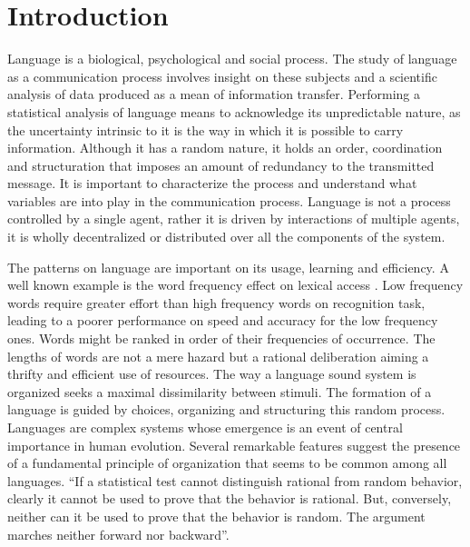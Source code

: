 \chapter{Introduction}
Language is a biological, psychological and social process. 
The study of language as a communication process involves insight on these subjects 
and a scientific analysis of data produced as a mean of information transfer. 
Performing a statistical analysis of language means 
to acknowledge its unpredictable nature, as the uncertainty intrinsic to it is the 
way in which it is possible to carry information.
Although it has a random nature, 
it holds an order, coordination and structuration that 
imposes an amount of redundancy to the transmitted message.
It is important to characterize the process and understand what variables 
are into play in the communication process.
Language is not a process controlled by a single agent, rather it is 
driven by interactions of multiple agents, it is wholly decentralized or distributed 
over all the components of the system.

The patterns on language are important on its usage, learning and efficiency.
A well known example is the word frequency effect on lexical access \citep{whaley1978,grainger90,saly1989}.
Low frequency words require greater effort than high frequency words on recognition task,
leading to a poorer performance on speed and accuracy for the low frequency ones.
Words might be ranked in order of their frequencies of occurrence.
The lengths of words are not a mere hazard 
but a rational deliberation aiming a thrifty and efficient use of resources. 
The way a language sound system is organized seeks a maximal dissimilarity between stimuli. 
The formation of a language is guided by choices, organizing and
structuring this random process. Languages are complex systems whose emergence is
an event of central importance in human evolution. Several remarkable features suggest the presence of
a fundamental principle of organization that seems to be common among all languages.
``If a statistical test cannot distinguish rational from random behavior, clearly it cannot 
be used to prove that the behavior is rational. But, conversely, neither can it be used to 
prove that the behavior is random. The argument marches neither forward nor backward''\citep{miller1965}.

